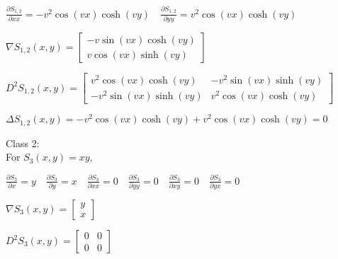 \documentclass[12pt, executivepaper]{article}
\begin{document}
\begin{flushleft}
$\frac{\partial S_{1,2}}{\partial xx}=-v^2\cos(vx)\cosh(vy) \quad \frac{\partial S_{1,2}}{\partial yy}=v^2\cos(vx)\cosh(vy)$ \\

\vspace{3mm}


$\nabla S_{1,2}(x,y)=
\begin{bmatrix}
-v\sin(vx)\cosh(vy) \\
v\cos(vx)\sinh(vy)
\end{bmatrix}$

\vspace{3mm}

$D^2 S_{1,2}(x,y)=
\begin{bmatrix}
v^2\cos(vx)\cosh(vy) & -v^2\sin(vx)\sinh(vy) \\
-v^2\sin(vx)\sinh(vy) & v^2\cos(vx)\cosh(vy)
\end{bmatrix}$

\vspace{3mm}

$\Delta S_{1,2}(x,y)=-v^2\cos(vx)\cosh(vy)+v^2\cos(vx)\cosh(vy)=0$

\vspace{5mm}

Class 2: \\

For $S_{3}(x,y)=xy$, \\

\vspace{3mm}

$\frac{\partial S_{3}}{\partial x}=y \quad \frac{\partial S_{3}}{\partial y}=x \quad \frac{\partial S_{3}}{\partial xx}=0 \quad \frac{\partial S_{3}}{\partial yy}=0 \quad \frac{\partial S_{3}}{\partial xy}=0 \quad \frac{\partial S_{3}}{\partial yx}=0$ \\

\vspace{3mm}

$\nabla S_{3}(x,y)=
\begin{bmatrix}
y \\
x
\end{bmatrix}$

\vspace{3mm}

$D^2 S_{3}(x,y)=
\begin{bmatrix}
0 & 0 \\
0 & 0
\end{bmatrix}$

\vspace{3mm}


\end{flushleft}
\end{document}
